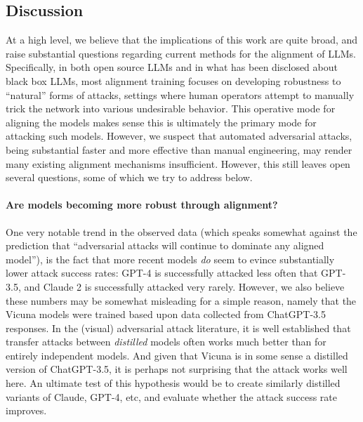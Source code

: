 \subsection{Discussion}
\label{sec:discussion}

At a high level, we believe that the implications of this work are quite broad, and raise substantial questions regarding current methods for the alignment of LLMs.  Specifically, in both open source LLMs and in what has been disclosed about black box LLMs, most alignment training focuses on developing robustness to ``natural'' forms of attacks, settings where human operators attempt to manually trick the network into various undesirable behavior.  This operative mode for aligning the models makes sense this is ultimately the primary mode for attacking such models.  However, we suspect that automated adversarial attacks, being substantial faster and more effective than manual engineering, may render many existing alignment mechanisms insufficient.  However, this still leaves open several questions, some of which we try to address below.

\paragraph{Are models becoming more robust through alignment?} One very notable trend in the observed data (which speaks somewhat against the prediction that ``adversarial attacks will continue to dominate any aligned model''), is the fact that more recent models \emph{do} seem to evince substantially lower attack success rates: GPT-4 is successfully attacked less often that GPT-3.5, and Claude 2 is successfully attacked very rarely.  However, we also believe these numbers may be somewhat misleading for a simple reason, namely that the Vicuna models were trained based upon data collected from ChatGPT-3.5 responses.  In the (visual) adversarial attack literature, it is well established that transfer attacks between \emph{distilled} models often works much better than for entirely independent models.  And given that Vicuna is in some sense a distilled version of ChatGPT-3.5, it is perhaps not surprising that the attack works well here.  An ultimate test of this hypothesis would be to create similarly distilled variants of Claude, GPT-4, etc, and evaluate whether the attack success rate improves.

